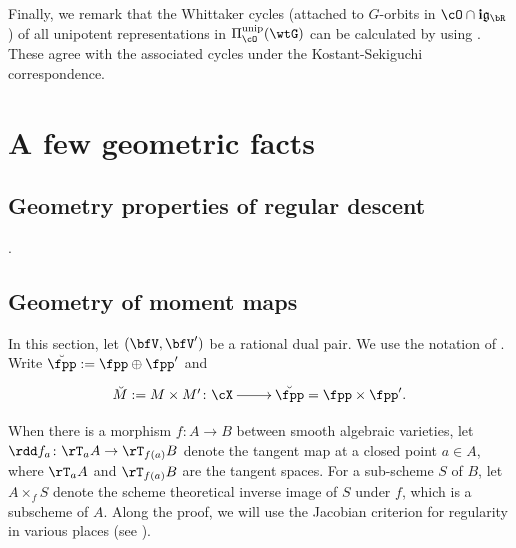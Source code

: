 \documentclass[12pt,a4paper]{amsart}
\numberwithin{equation}{section}
\theoremstyle{remark}
\def\Piunip{\Pi^{\mathrm{unip}}}
\begin{document}
Finally, we remark that the Whittaker cycles (attached to $G$-orbits in $\cO\cap \mathbf i \frak g_\bR$) of all unipotent representations in  $\Piunip_{\cO}(\wtG)$ can be calculated  by using \cite[Theorem 1.1]{GZ}. These agree with the associated cycles under the Kostant-Sekiguchi correspondence.



\appendix
\section{A few geometric facts}
\def\dbM{\breve{M}}
\def\dbMM{\breve{MM}}
\def\dbX{\breve{X}}
\def\dbfpp{\breve{\fpp}}
\def\ZdbX{\cZ_{\dbX}}
\def\aV{\acute{V}}


\subsection{Geometry properties of regular descent}.



\subsection{Geometry of moment maps}\label{sec:GM}
In this section, let $(\bfV,\bfV')$ be a rational dual
pair. %
We use the notation of .
Write
 $\dbfpp := \fpp\oplus \fpp'$ and
\[
\xymatrix{
\dbM := M\times M' \colon \cX \ar[r]& \dbfpp
= \fpp\times \fpp'.
}
\]




When there is a morphism $f\colon A\rightarrow B$ between smooth
algebraic varieties, let $\rdd f_a\colon \rT_aA
\rightarrow \rT_{f(a)}B$ denote the tangent map at a closed point $a\in A$, where
$\rT_aA$ and $\rT_{f(a)} B$ are the tangent spaces. For a
sub-scheme $S$ of $B$, let $A\times_fS$ denote the scheme
theoretical inverse image of $S$ under $f$, which is a subscheme of $A$.
Along the proof, we will use the Jacobian criterion for
regularity in various places (see \cite[Theorem~2.19]{LiuAG}).
\end{document}
